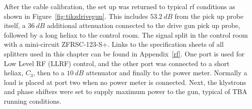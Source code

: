 \label{gunenergy}
After the cable calibration, the set up was returned to typical rf conditions as 
shown in Figure~\ref{fig:tikzdrivegun}. This includes $\SI{53.2}{dB}$ from the pick 
up probe itself, a $\SI{36}{dB}$ additional attenuation connected to the 
drive gun pick up probe, followed by a long heliax to the 
control room. The signal split in the control room with a mini-circuit ZFRSC-123-S+. 
Links to the specification sheets of all splitters used in this chapter can be found in Appendix~\ref{rf}.
One port is used for Low Level RF (LLRF) control, and the other port was connected to a short 
heliax, $C_3$, then to a $\SI{10}{dB}$ attenuator and finally to the 
power meter. Normally a load is placed at port two when no power meter is connected. 
Next, the klystrons and phase shifters were set to supply 
maximum power to the gun, typical of TBA running conditions. 
\def \delayvertical {1.5}
\iftrue
